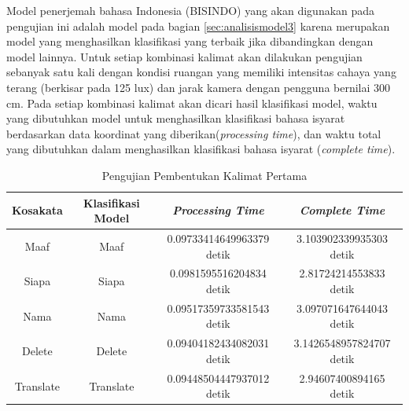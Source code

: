 Model penerjemah bahasa Indonesia (BISINDO) yang akan digunakan pada pengujian ini adalah model pada bagian \ref{sec:analisismodel3} karena merupakan model yang menghasilkan klasifikasi yang terbaik jika dibandingkan dengan model lainnya. Untuk setiap kombinasi kalimat akan dilakukan pengujian sebanyak satu kali dengan kondisi ruangan yang memiliki intensitas cahaya yang terang (berkisar pada 125 lux) dan jarak kamera dengan pengguna bernilai 300 cm. Pada setiap kombinasi kalimat akan dicari hasil klasifikasi model, waktu yang dibutuhkan model untuk menghasilkan klasifikasi bahasa isyarat berdasarkan data koordinat yang diberikan(\emph{processing time}), dan waktu total yang dibutuhkan dalam menghasilkan klasifikasi bahasa isyarat (\emph{complete time}).  

\begin{longtable}{|c|c|c|c|}
  \caption{Pengujian Pembentukan Kalimat Pertama}
  \label{tb:prediksikombinasi1}                                   \\
  \hline
  \rowcolor[HTML]{C0C0C0}
  \textbf{Kosakata} & \textbf{Klasifikasi Model} & \textbf{\emph{Processing Time}} & \textbf{\emph{Complete Time}}\\
  \hline
  Maaf                & Maaf                          & 0.09733414649963379 detik                           & 3.103902339935303 detik                                 \\
  Siapa               & Siapa                         & 0.0981595516204834 detik                            & 2.81724214553833 detik                                \\
  Nama                & Nama                          & 0.09517359733581543 detik                           & 3.097071647644043 detik                                 \\
  Delete              & Delete                        & 0.09404182434082031 detik                           & 3.1426548957824707 detik                                  \\
  Translate           & Translate                     & 0.09448504447937012 detik                           & 2.94607400894165 detik                                \\
  \hline
\end{longtable}

